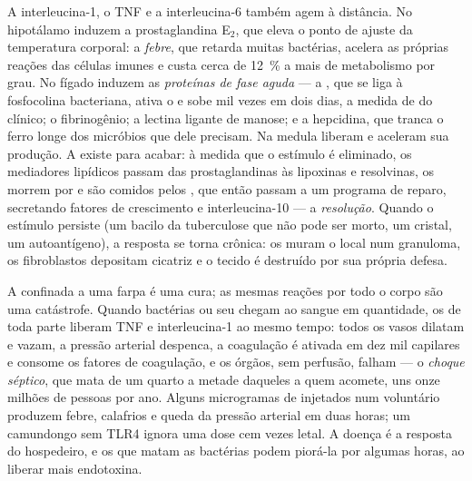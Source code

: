 \begin{proposition}\label{prop:b3:innate-immunity:systemic}
A interleucina-1, o TNF e a interleucina-6 também agem à distância. No
hipotálamo induzem a prostaglandina E$_{2}$, que eleva o ponto de
ajuste da temperatura corporal: a \emph{febre}, que retarda muitas
bactérias, acelera as próprias reações das células imunes e custa cerca
de \qty{12}{\%} a mais de metabolismo por grau. No fígado induzem as
\emph{proteínas de fase aguda} --- a , que se liga à
fosfocolina bacteriana, ativa o  e sobe mil vezes em dois
dias, a medida de  do clínico; o fibrinogênio; a lectina
ligante de manose; e a hepcidina, que tranca o ferro longe dos
micróbios que dele precisam. Na medula liberam  e aceleram
sua produção. A  existe para acabar: à medida que o estímulo
é eliminado, os mediadores lipídicos passam das prostaglandinas às
lipoxinas e resolvinas, os  morrem por  e são comidos
pelos , que então passam a um programa de reparo, secretando
fatores de crescimento e interleucina-10 --- a \emph{resolução}. Quando
o estímulo persiste (um bacilo da tuberculose que não pode ser morto,
um cristal, um autoantígeno), a resposta se torna crônica: os 
muram o local num granuloma, os fibroblastos depositam cicatriz e o
tecido é destruído por sua própria defesa.
\end{proposition}

\begin{example}[Sepse]\label{ex:b3:innate-immunity:sepsis}
A  confinada a uma farpa é uma cura; as mesmas reações por
todo o corpo são uma catástrofe. Quando bactérias ou seu
 chegam ao sangue em quantidade, os  de
toda parte liberam TNF e interleucina-1 ao mesmo tempo: todos os vasos
dilatam e vazam, a pressão arterial despenca, a coagulação é ativada em
dez mil capilares e consome os fatores de coagulação, e os órgãos, sem
perfusão, falham --- o \emph{choque séptico}, que mata de um quarto a
metade daqueles a quem acomete, uns onze milhões de pessoas por ano.
Alguns microgramas de  injetados num voluntário
produzem febre, calafrios e queda da pressão arterial em duas horas; um
camundongo sem TLR4 ignora uma dose cem vezes letal. A doença é a
resposta do hospedeiro, e os  que matam as bactérias podem
piorá-la por algumas horas, ao liberar mais endotoxina.
\end{example}


